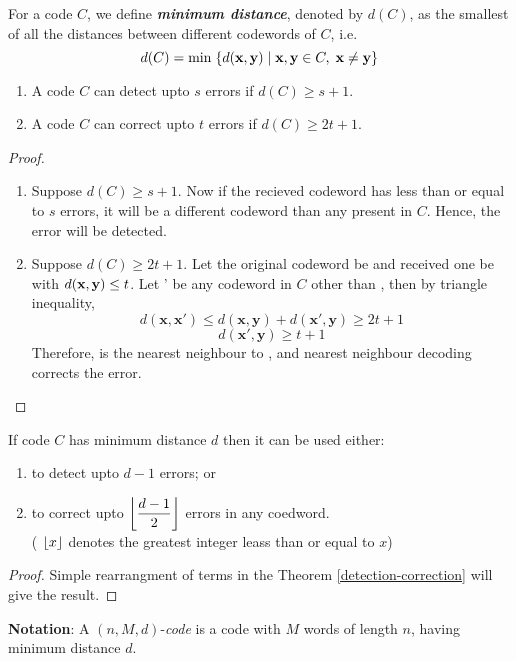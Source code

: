 \documentclass[../main.tex]{subfiles}
\begin{document}
\begin{defn}
	For a code $C$, we define \textbf{\emph{minimum distance}}, denoted by $d(C)$, as the smallest of all the distances between different codewords of $C$, i.e.
	\[
		d(C)=\min\;\{d(\textbf{x},\textbf{y})\;| \; \textbf{x},\textbf{y} \in C,\; \textbf{x} \neq \textbf{y}\}
	\]
\end{defn}

\begin{thm}\label{detection-correction}
	\hfill
	\begin{enumerate}[label=(\roman*)]
		\item A code $C$ can detect upto $s$ errors if $d(C)\geq s+1$. 
		\item A code $C$ can correct upto $t$ errors if $d(C)\geq 2t+1$.
	\end{enumerate}
\end{thm}
\begin{proof}
	\hfill
	\begin{enumerate}[label=(\roman*)]
		\item Suppose $d(C)\geq s+1$. Now if the recieved codeword has less than or equal to $s$ errors, it will be a different codeword than any present in $C$. Hence, the error will be detected. 
		\item Suppose $d(C)\geq 2t+1$. Let the original codeword be  and received one be  with $d(\textbf{x},\textbf{y})\leq t$. Let ' be any codeword in $C$ other than , then by triangle inequality,
		\[
			d(\textbf{x},\textbf{x}')\leq d(\textbf{x},\textbf{y}) + d(\textbf{x}', \textbf{y}) \geq 2t+1 
		\]
		\[
			d(\textbf{x}', \textbf{y}) \geq t+1
		\]
		Therefore,  is the nearest neighbour to , and nearest neighbour decoding corrects the error.
	\end{enumerate}
\end{proof}

\begin{cor}\label{cor_det-crctn}
	If code $C$ has minimum distance $d$ then it can be used either:
	\begin{enumerate}[label=(\roman*)]
		\item to detect upto $d-1$ errors; or
		\item\label{correction} to correct upto $\left\lfloor \dfrac{d-1}{2} \right\rfloor$ errors in any coedword.\\
		( $\left\lfloor x \right\rfloor$ denotes the greatest integer leass than or equal to $x$)
	\end{enumerate}				
\end{cor}

\begin{proof}
	Simple rearrangment of terms in the Theorem \ref{detection-correction} will give the result.
\end{proof}

\textbf{Notation}: A $(n,M,d)$-\emph{code} is a code with $M$ words of length $n$, having minimum distance $d$.
\end{document}
